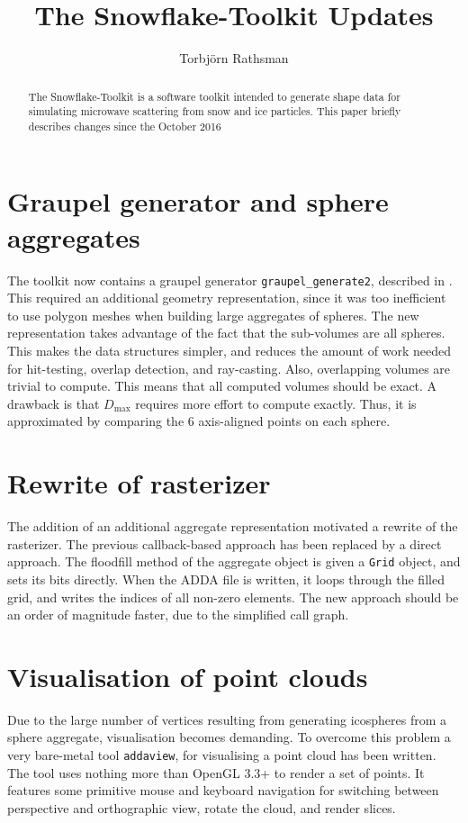 \documentclass[a4paper,10pt]{scrartcl}
\title{The Snowflake-Toolkit Updates}
\author{Torbjörn Rathsman}
\begin{document}
\maketitle
\begin{abstract}
The Snowflake-Toolkit is a software toolkit intended to generate shape data for simulating microwave scattering from snow and ice particles. This paper briefly describes changes since the October 2016 
\end{abstract}



\tableofcontents

\section{Graupel generator and sphere aggregates}
The toolkit now contains a graupel generator \texttt{graupel\_generate2}, described in \cite{graupelgen}. This required an additional geometry representation, since it was too inefficient to use polygon meshes when building large aggregates of spheres. The new representation takes advantage of the fact that the sub-volumes are all spheres. This makes the data structures simpler, and reduces the amount of work needed for hit-testing, overlap detection, and ray-casting. Also, overlapping volumes are trivial to compute. This means that all computed volumes should be exact. A drawback is that $D_\text{max}$ requires more effort to compute exactly. Thus, it is approximated by comparing the 6 axis-aligned points on each sphere.

\section{Rewrite of rasterizer}
The addition of an additional aggregate representation motivated a rewrite of the rasterizer. The previous callback-based approach has been replaced by a direct approach. The floodfill method of the aggregate object is given a \texttt{Grid} object, and sets its bits directly. When the ADDA file is written, it loops through the filled grid, and writes the indices of all non-zero elements. The new approach should be an order of magnitude faster, due to the simplified call graph.

\section{Visualisation of point clouds}
Due to the large number of vertices resulting from generating icospheres from a sphere aggregate, visualisation becomes demanding. To overcome this problem a very bare-metal tool \texttt{addaview}, for visualising a point cloud has been written. The tool uses nothing more than OpenGL 3.3+ to render a set of points. It features some primitive mouse and keyboard navigation for switching between perspective and orthographic view, rotate the cloud, and render slices.
\end{document}
